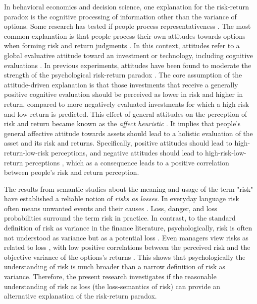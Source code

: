 \documentclass[a4paper,man, natbib,floatsintext]{apa6} %
\begin{document}
In behavioral economics and decision science, one explanation for the risk-return paradox is the cognitive processing of information other than the variance of options. Some research has tested if people process representativeness \citep{Shefrin1995, Shefrin2001, Pachur2012b}. The most common explanation is that people process their own attitudes towards options when forming risk and return judgments \citep[e.g.,][]{Finucane2000}. In this context, attitudes refer to a global evaluative attitude toward an investment or technology, including cognitive evaluations \citep[a global "good and bad"; ][]{Ganzach2000, Sjoerberg2007,Sokolowska2015}. In previous experiments, attitudes have been found to moderate the strength of the psychological risk-return paradox \citep{Ganzach2000, Kempf2014, Finucane2000, Slovic2004}. The core assumption of the attitude-driven explanation is that those investments that receive a generally positive cognitive evaluation should be perceived as lower in risk and higher in return, compared to more negatively evaluated investments for which a high risk and low return is predicted. This effect of general attitudes on the perception of risk and return became known as the \textit{affect heuristic} \citep{Finucane2000,Slovic2004}. It implies that people's general affective attitude towards assets should lead to a holistic evaluation of the asset and its risk and returns. Specifically, positive attitudes should lead to high-return-low-risk perceptions, and negative attitudes should lead to high-risk-low-return perceptions \citep{Ganzach2000, Finucane2000}, which as a consequence leads to a positive correlation between people's risk and return perception.

 The results from semantic studies about the meaning and usage of the term "risk" have established a reliable notion of \textit{risks as losses}. In everyday language risk often means unwanted events and their causes \citep[American English corpus from 1992-2012,][]{Boholm2016}. Loss, danger, and loss probabilities surround the term risk in practice. In contrast, to the standard definition of risk as variance in the finance literature, psychologically, risk is often not understood as variance but as a potential loss \citep[e.g.][]{Libby1977, Sachse2012}. Even managers view risks as related to loss \citep{Mohr2010, Duxbury2004, Shapira1995}, with low positive correlations between the perceived risk and the objective variance of the options's returns \citep{Weber2005,Klos2005a}. This shows that psychologically the understanding of risk is much broader than a narrow definition of risk as variance. Therefore, the present research investigates if the reasonable understanding of risk as loss (the loss-semantics of risk) can provide an alternative explanation of the risk-return paradox.
\end{document}
